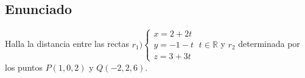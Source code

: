 \subsection{Enunciado}
\noindent Halla la distancia entre las rectas $r_1) \begin{cases}
	x = 2 + 2t \\
	y = -1 - t \\
	z = 3 + 3t
\end{cases} \ t \in \mathbb{R}$ y $r_2$ determinada por los puntos $P(1, 0, 2)$ y $Q(-2, 2, 6)$.
